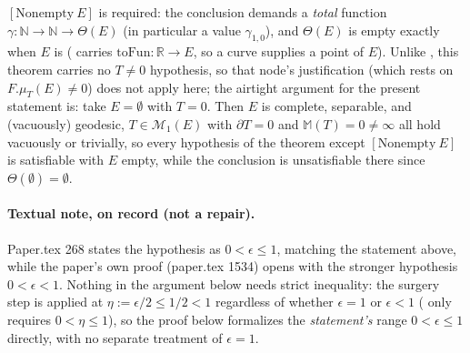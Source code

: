 \begin{theorem}
  $[\mathrm{Nonempty}\ E]$ is required: the conclusion demands a \emph{total} function
  $\gamma\colon\mathbb N\to\mathbb N\to\Theta(E)$ (in particular a value $\gamma_{1,0}$), and
  $\Theta(E)$ is empty exactly when $E$ is ( carries $\mathrm{toFun}\colon\mathbb
  R\to E$, so a curve supplies a point of $E$). Unlike , this theorem carries
  no $T\ne0$ hypothesis, so that node's justification (which rests on $F.\mu_T(E)\ne0$) does not
  apply here; the airtight argument for the present statement is: take $E=\emptyset$ with $T=0$.
  Then $E$ is complete, separable, and (vacuously) geodesic, $T\in\mathcal M_1(E)$ with
  $\partial T=0$ and $\mathbb M(T)=0\ne\infty$ all hold vacuously or trivially, so every hypothesis
  of the theorem except $[\mathrm{Nonempty}\ E]$ is satisfiable with $E$ empty, while the
  conclusion is unsatisfiable there since $\Theta(\emptyset)=\emptyset$.

  \paragraph{Textual note, on record (not a repair).} Paper.tex 268 states the hypothesis as
  $0<\epsilon\le1$, matching the statement above, while the paper's own proof (paper.tex 1534)
  opens with the stronger hypothesis $0<\epsilon<1$. Nothing in the argument below needs strict
  inequality: the surgery step is applied at $\eta:=\epsilon/2\le1/2<1$ regardless of whether
  $\epsilon=1$ or $\epsilon<1$ ( only requires $0<\eta\le1$), so the proof below
  formalizes the \emph{statement's} range $0<\epsilon\le1$ directly, with no separate treatment of
  $\epsilon=1$.
\end{theorem}
